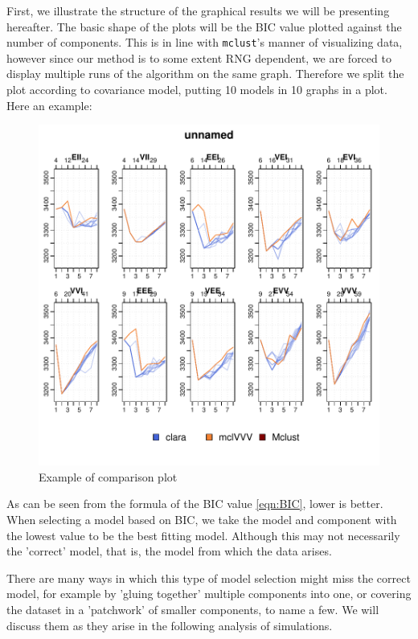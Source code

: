 First, we illustrate the structure of the graphical results we will be 
presenting hereafter. The basic shape of the plots will be the BIC value 
plotted against the number of components. This is in line with {\tt mclust}'s
manner of visualizing data, however since our method is to some extent RNG 
dependent, we are forced to display multiple runs of the algorithm on the same
graph. Therefore we split the plot according to covariance model, putting 10
models in 10 graphs in a plot. Here an example:


\begin{figure}[h!]
    \begin{Rgraph}[0.9]
\includegraphics{chapter3-bicplotdemoplot}
    \caption{Example of comparison plot}
    \label{fig:ExPlot}
    \end{Rgraph}
\end{figure}

As can be seen from the formula of the BIC value \ref{eqn:BIC}, lower is better.
When selecting a model based on BIC, we take the model and component with the 
lowest value to be the best fitting model. Although this may not necessarily
the 'correct' model, that is, the model from which the data arises.

There are many ways in which this type of model selection might miss the 
correct model, for example by 'gluing together' multiple components into one,
or covering the dataset in a 'patchwork' of smaller components, to name a few.
We will discuss them as they arise in the following analysis of simulations.

